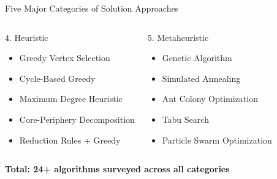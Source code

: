 \documentclass[aspectratio=169]{beamer}
\begin{document}
\begin{frame}{Five Major Categories of Solution Approaches}
\begin{columns}[T]
        
        \begin{block}{4. Heuristic}
            \scriptsize
            \begin{itemize}
                \item Greedy Vertex Selection
                \item Cycle-Based Greedy
                \item Maximum Degree Heuristic
                \item Core-Periphery Decomposition
                \item Reduction Rules + Greedy
            \end{itemize}
        \end{block}
        
        \begin{block}{5. Metaheuristic}
            \scriptsize
            \begin{itemize}
                \item Genetic Algorithm
                \item Simulated Annealing
                \item Ant Colony Optimization
                \item Tabu Search
                \item Particle Swarm Optimization
            \end{itemize}
        \end{block}
        
        \vspace{1.8cm} %
    \end{columns}
    
    \centering
    \vspace{0.2cm}
    \textbf{Total: 24+ algorithms surveyed across all categories}
\end{frame}
\end{document}
